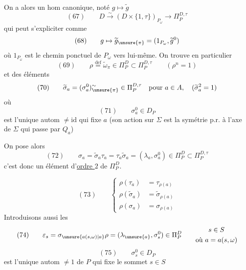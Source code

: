 On a alors un hom canonique,  noté $g\mapsto\widetilde g$ 
\[
(67)\qquad D\xrightarrow{\sim}(D\times\{1,\tau\})_{P_\omega}
\longrightarrow\Pi_P^{D,\tau}
\]
qui peut s'expliciter comme
\[
(68)\qquad g\mapsto\widetilde g_{\unsure{\pi}}=(1_{P_\omega},\widetilde g^0)
\]
où $1_{P_\omega}$ est le chemin  ponctuel de $P_\omega$ vers lui-même.
On trouve en particulier
\[
(69)\qquad \rho\overset{\mathrm{def}}=\widetilde\omega_\pi\in\Pi_P^D\subset\Pi_P^{D,\tau}
\qquad(\rho^n=1)
\]
et des éléments
\[
(70)\qquad \widetilde\sigma_a=(\sigma_a^0)^{\sim}_{\unsure{\pi}}\in\Pi_P^{D,\tau}
\quad\text{pour }a\in A,\quad(\widetilde\sigma_a^2=1)
\]
où
\[
(71)\qquad \sigma_a^0\in D_P
\]
est l'unique autom $\ne\mathrm{id}$ qui fixe $a$ (son action sur $\Sigma$ est la symétrie p.r. à l'axe de $\Sigma$ qui passe par $Q_a$)

On pose alors
\[
(72)\qquad \sigma_a=\widetilde\sigma_a\tau_a=\tau_a\widetilde\sigma_a
=(\lambda_a,\sigma_a^0)\in\Pi_P^D\subset\Pi_P^{D,\tau}
\]
c'est donc un élément d'\uline{ordre $2$} de $\Pi_P^D$.

\[
(73)\qquad
\left\{
\begin{aligned}
\rho(\tau_a)&=\tau_{\rho(a)}\\
\rho(\widetilde\sigma_a)&=\widetilde\sigma_{\rho(a)}\\
\rho(\sigma_a)&=\sigma_{\rho(a)}
\end{aligned}
\right.
\]
Introduisons aussi les
\[
(74)\qquad
\varepsilon_s=\sigma_{\unsure{a(s,\omega)|a}}\rho
=(\lambda_{\unsure{a}},\sigma_s^0)\in\Pi_P^D
\qquad
\begin{gathered}
s\in S\\
\text{où }a=a(s,\omega)
\end{gathered}
\]
\[
(75)\qquad \sigma_s^0\in D_P
\]
est l'unique autom $\ne1$ de $P$ qui fixe le sommet $s\in S$
